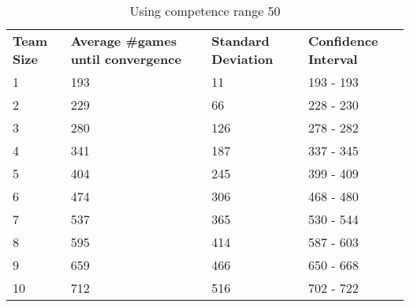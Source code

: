 \documentclass[12pt]{article}
\begin{document}
\begin{table}[!htb]
	\centering
	\caption{Using competence range 50}
	\begin{tabular}{llll}
		\textbf{Team Size} & \textbf{Average \#games until convergence} & \textbf{Standard Deviation} & \textbf{Confidence Interval} \\
		1                  & 193              & 11                          & 193 - 193                    \\
		2                  & 229              & 66                          & 228 - 230                    \\
		3                  & 280              & 126                         & 278 - 282                    \\
		4                  & 341              & 187                         & 337 - 345                    \\
		5                  & 404              & 245                         & 399 - 409                    \\
		6                  & 474              & 306                         & 468 - 480                    \\
		7                  & 537              & 365                         & 530 - 544                    \\
		8                  & 595              & 414                         & 587 - 603                    \\
		9                  & 659              & 466                         & 650 - 668                    \\
		10                 & 712              & 516                         & 702 - 722                   
	\end{tabular}
\end{table}
\end{document}
